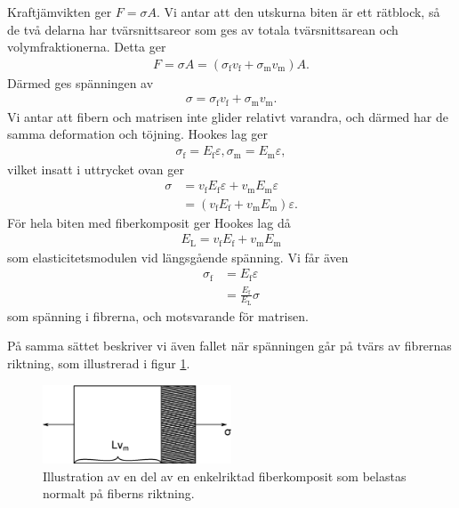 Kraftjämvikten ger $F = \sigma A$. Vi antar att den utskurna biten är ett rätblock, så de två delarna har tvärsnittsareor som ges av totala tvärsnittsarean och volymfraktionerna. Detta ger
\begin{align*}
	F = \sigma A = (\sigma_{\text{f}}v_{\text{f}} + \sigma_{\text{m}}v_{\text{m}})A.
\end{align*}
Därmed ges spänningen av
\begin{align*}
	\sigma = \sigma_{\text{f}}v_{\text{f}} + \sigma_{\text{m}}v_{\text{m}}.
\end{align*}
Vi antar att fibern och matrisen inte glider relativt varandra, och därmed har de samma deformation och töjning. Hookes lag ger
\begin{align*}
	\sigma_{\text{f}} = E_{\text{f}}\varepsilon, \sigma_{\text{m}} = E_{\text{m}}\varepsilon,
\end{align*}
vilket insatt i uttrycket ovan ger
\begin{align*}
	\sigma &= v_{\text{f}}E_{\text{f}}\varepsilon + v_{\text{m}}E_{\text{m}}\varepsilon \\
	       &= (v_{\text{f}}E_{\text{f}} + v_{\text{m}}E_{\text{m}})\varepsilon.
\end{align*}
För hela biten med fiberkomposit ger Hookes lag då
\begin{align*}
	E_{\text{L}} = v_{\text{f}}E_{\text{f}} + v_{\text{m}}E_{\text{m}}
\end{align*}
som elasticitetsmodulen vid längsgående spänning. Vi får även
\begin{align*}
	\sigma_{\text{f}} &= E_{\text{f}}\varepsilon \\
	                  &= \frac{E_{\text{f}}}{E_{\text{L}}}\sigma
\end{align*}
som spänning i fibrerna, och motsvarande för matrisen.

På samma sättet beskriver vi även fallet när spänningen går på tvärs av fibrernas riktning, som illustrerad i figur \ref{fig:fiber_composite_normal}.
\begin{figure}[!ht]
	\centering
	\includegraphics[width = 0.5\textwidth]{./Images/fiber_composite_normal.eps}
	\caption{Illustration av en del av en enkelriktad fiberkomposit som belastas normalt på fiberns riktning.}
	\label{fig:fiber_composite_normal}
\end{figure}

